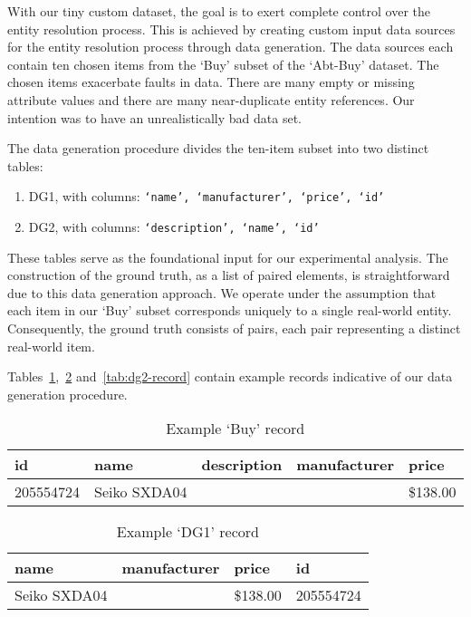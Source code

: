 With our tiny custom dataset, the goal is to exert complete control over the entity
resolution process.
This is achieved by creating custom input data sources for the entity resolution
process through data generation.
The data sources each contain ten chosen items from the `Buy' subset of the
`Abt-Buy' dataset.
The chosen items exacerbate faults in data.
There are many empty or missing attribute values and there are many
near-duplicate entity references.
Our intention was to have an unrealistically bad data set.

The data generation procedure divides the ten-item subset into two distinct
tables:

\begin{enumerate}[label=\textbullet,leftmargin=1cm]
    \item DG1, with columns: \texttt{`name', `manufacturer', `price', `id'}
    \item DG2, with columns: \texttt{`description', `name', `id'}
\end{enumerate}

These tables serve as the foundational input for our experimental analysis.
The construction of the ground truth, as a list of paired elements, is
straightforward due to this data generation approach.
We operate under the assumption that each item in our `Buy' subset
corresponds uniquely to a single real-world entity.
Consequently, the ground truth consists of pairs, each pair representing a
distinct real-world item.

Tables~\ref{tab:buy-record},~\ref{tab:dg1-record} and~\ref{tab:dg2-record} contain example
records indicative of our data generation procedure.

\begin{table}[ht]
    \setlength\tabcolsep{6pt}
    \centering
    \begin{tabular}{lllll}
        \toprule
        id        & name         & description & manufacturer & price    \\
        \midrule
        205554724 & Seiko SXDA04 &             &              & \$138.00 \\
        \bottomrule
    \end{tabular}
    \caption{Example `Buy' record}\label{tab:buy-record}
\end{table}

\begin{table}[ht]
    \setlength\tabcolsep{12pt}
    \centering
    \begin{tabular}{llll}
        \toprule
        name         & manufacturer & price    & id        \\
        \midrule
        Seiko SXDA04 &              & \$138.00 & 205554724 \\
        \bottomrule
    \end{tabular}
    \caption{Example `DG1' record}\label{tab:dg1-record}
\end{table}

